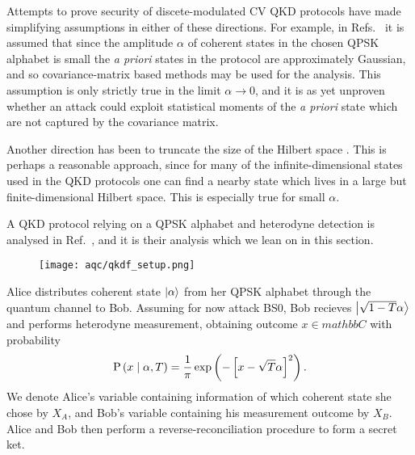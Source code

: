 Attempts to prove security of discete-modulated CV QKD protocols have made simplifying assumptions in either of these directions. For example, in Refs.~\cite{Leverrier2011a, Ghorai2019, Lin2019} it is assumed that since the amplitude $\alpha$ of coherent states in the chosen QPSK alphabet is small the \emph{a priori} states in the protocol are approximately Gaussian, and so covariance-matrix based methods may be used for the analysis. This assumption is only strictly true in the limit $\alpha \rightarrow 0$, and it is as yet unproven whether an attack could exploit statistical moments of the \emph{a priori} state which are not captured by the covariance matrix.


Another direction has been to truncate the size of the Hilbert space \cite{Ghorai2019, Lin2019, Papanastasiou2018}. This is perhaps a reasonable approach, since for many of the infinite-dimensional states used in the QKD protocols one can find a nearby state which lives in a large but finite-dimensional Hilbert space. This is especially true for small $\alpha$. 

A QKD protocol relying on a QPSK alphabet and heterodyne detection is analysed in Ref.~\cite{Papanastasiou2018}, and it is their analysis which we lean on in this section. 


\begin{figure}[htp]
\centering
\texttt{[image: aqc/qkdf\_setup.png]}
\caption{\label{fig:aqc_qkdf_setup}}
\end{figure}

Alice distributes coherent state $\ket{\alpha}$ from her QPSK alphabet through the quantum channel to Bob. Assuming for now attack BS$0$, Bob recieves $\ket{\sqrt{1-T}\alpha}$ and performs heterodyne measurement, obtaining outcome $x \in mathbb{C}$ with probability
\begin{equation}
\text{P}\left(x\; \middle| \; \alpha, T\right) = \frac{1}{\pi}\exp\left( - \left[ x - \sqrt{T}\alpha\right]^2\right).
\end{equation}
We denote Alice's variable containing information of which coherent state she chose by $X_A$, and Bob's variable containing his measurement outcome by $X_B$. Alice and Bob then perform a reverse-reconciliation procedure \cite{Grosshans2002, Grosshans2003, Laudenbach2017} to form a secret ket.

